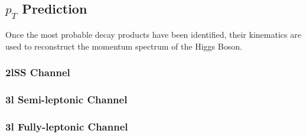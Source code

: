 
\subsection{$p_T$ Prediction}
\label{sec:ptReco}

Once the most probable decay products have been identified, their kinematics are used to reconstruct the momentum spectrum of the Higgs Boson. 

\subsubsection{2lSS Channel}
\label{subsec:pt2lSS}                                                                                                      


                                                                                                                            

\subsubsection{3l Semi-leptonic Channel}
\label{subsec:pt3lS}




\subsubsection{3l Fully-leptonic Channel}
\label{subsec:pt3lF}

